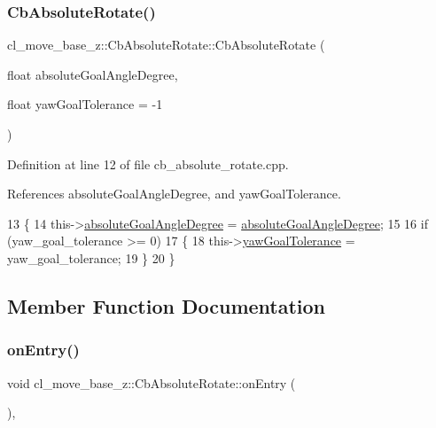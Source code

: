 \subsubsection{\texorpdfstring{Cb\+Absolute\+Rotate()}{CbAbsoluteRotate()}\hspace{0.1cm}{\footnotesize\ttfamily [2/2]}}
{\footnotesize\ttfamily cl\+\_\+move\+\_\+base\+\_\+z\+::\+Cb\+Absolute\+Rotate\+::\+Cb\+Absolute\+Rotate (\begin{DoxyParamCaption}\item[{float}]{absolute\+Goal\+Angle\+Degree,  }\item[{float}]{yaw\+Goal\+Tolerance = {\ttfamily -\/1} }\end{DoxyParamCaption})}



Definition at line 12 of file cb\+\_\+absolute\+\_\+rotate.\+cpp.



References absolute\+Goal\+Angle\+Degree, and yaw\+Goal\+Tolerance.


\begin{DoxyCode}
13 \{
14   this->\hyperlink{classcl__move__base__z_1_1CbAbsoluteRotate_ad5d0e21549940444e1cb525cda73329a}{absoluteGoalAngleDegree} = \hyperlink{classcl__move__base__z_1_1CbAbsoluteRotate_ad5d0e21549940444e1cb525cda73329a}{absoluteGoalAngleDegree};
15 
16   \textcolor{keywordflow}{if} (yaw\_goal\_tolerance >= 0)
17   \{
18     this->\hyperlink{classcl__move__base__z_1_1CbAbsoluteRotate_a8d8b5b9c2c821efe101bb07c96c4bdd3}{yawGoalTolerance} = yaw\_goal\_tolerance;
19   \}
20 \}
\end{DoxyCode}


\subsection{Member Function Documentation}
\mbox{\label{classcl__move__base__z_1_1CbAbsoluteRotate_a10418ea360809fa649d295716b152b2b}} 
\subsubsection{\texorpdfstring{on\+Entry()}{onEntry()}}
{\footnotesize\ttfamily void cl\+\_\+move\+\_\+base\+\_\+z\+::\+Cb\+Absolute\+Rotate\+::on\+Entry (\begin{DoxyParamCaption}{ }\end{DoxyParamCaption})\hspace{0.3cm}{\ttfamily [override]}, {\ttfamily [virtual]}}



